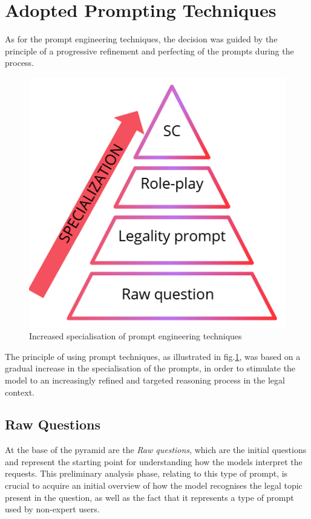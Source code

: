 \section{Adopted Prompting Techniques}
As for the prompt engineering techniques, the decision was guided by the principle of a progressive refinement and perfecting of the prompts during the process.
\begin{figure}[H]
    \centering
    \includegraphics[width=0.7\linewidth]{Figures/piramide.png}
    \caption{Increased specialisation of prompt engineering techniques}
    \label{fig:pyramide}
\end{figure}
The principle of using prompt techniques, as illustrated in fig.\ref{fig:pyramide}, was based on a gradual increase in the specialisation of the prompts, in order to stimulate the model to an increasingly refined and targeted reasoning process in the legal context. 
\subsection{Raw Questions}
At the base of the pyramid are the \textit{Raw questions}, which are the initial questions and represent the starting point for understanding how the models interpret the requests. This preliminary analysis phase, relating to this type of prompt, is crucial to acquire an initial overview of how the model recognises the legal topic present in the question, as well as the fact that it represents a type of prompt used by non-expert users.
